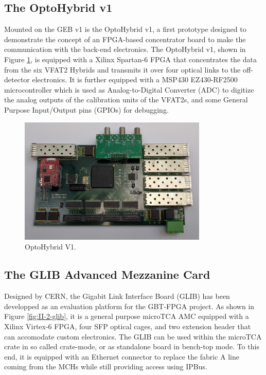     \subsection{The OptoHybrid v1}

      Mounted on the GEB v1 is the OptoHybrid v1, a first prototype designed to demonstrate the concept of an FPGA-based concentrator board to make the communication with the back-end electronics. The OptoHybrid v1, shown in Figure \ref{fig:II-2-ohv1}, is equipped with a Xilinx Spartan-6 FPGA that concentrates the data from the six VFAT2 Hybrids and transmits it over four optical links to the off-detector electronics. It is further equipped with a MSP430 EZ430-RF2500 \cite{MSP430} microcontroller which is used as Analog-to-Digital Converter (ADC) to digitize the analog outputs of the calibration units of the VFAT2s, and some General Purpose Input/Output pins (GPIOs) for debugging.

      \begin{figure}[h!]
        \centering
        \includegraphics[width=0.8\textwidth]{img/II-2-daq/oh-v1.jpg}
        \caption{OptoHybrid V1.}
        \label{fig:II-2-ohv1}
      \end{figure}

    \subsection{The GLIB Advanced Mezzanine Card}

      Designed by CERN, the Gigabit Link Interface Board (GLIB) \cite{Vichoudis:1359270} has been developped as an evaluation platform for the GBT-FPGA project. As shown in Figure \ref{fig:II-2-glib}, it is a general purpose microTCA AMC equipped with a Xilinx Virtex-6 FPGA, four SFP optical cages, and two extension header that can accomodate custom electronics. The GLIB can be used within the microTCA crate in so called crate-mode, or as standalone board in bench-top mode. To this end, it is equipped with an Ethernet connector to replace the fabric A line coming from the MCHs while still providing access using IPBus. \\


